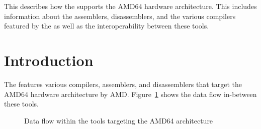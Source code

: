 




\renewcommand{\seeamd}{}

{This \documentation{} describes how the \ecs{} supports the AMD64 hardware architecture.
This includes information about the assemblers, disassemblers, and the various compilers featured by the \ecs{} as well as the interoperability between these tools.}

\section{Introduction}

The \ecs{} features various compilers, assemblers, and disassemblers that target the AMD64 hardware architecture by AMD\@.
Figure~\ref{fig:amd64dataflow} shows the data flow in-between these tools.

\begin{figure}
\caption{Data flow within the tools targeting the AMD64 architecture}
\label{fig:amd64dataflow}
\end{figure}

